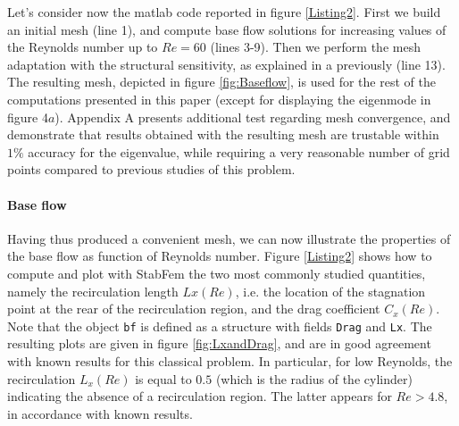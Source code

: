 \documentclass[twocolumn,10pt]{asme2ej}
\begin{document}
Let's consider now the matlab code reported in figure \ref{Listing2}. First we build an initial mesh (line 1), and compute base flow solutions for increasing values of the Reynolds number up to $Re = 60$ (lines 3-9).
Then we perform the mesh adaptation with the structural sensitivity, as explained in a previously (line 13). 
The resulting mesh, depicted in figure \ref{fig:Baseflow}, is used for the rest of the computations presented in this paper (except for displaying the eigenmode in figure 4$a$). 
Appendix A presents additional test regarding mesh convergence, and demonstrate that results obtained with the resulting mesh are trustable within $1\%$ accuracy for the eigenvalue, while requiring a very reasonable number of grid points compared to previous studies of this problem. 










\paragraph{Base flow}

Having thus produced a convenient mesh, we can now illustrate the properties of the base flow as function of Reynolds number. Figure \ref{Listing2} shows how to compute and plot with StabFem the two most commonly studied quantities, namely the recirculation length $Lx(Re)$, i.e. the location of the stagnation point at the rear of the recirculation region, and the drag coefficient $C_x(Re)$.
Note that the object \verb|bf| is defined as a structure with fields \verb|Drag| and \verb|Lx|. 
The resulting plots are given in figure \ref{fig:LxandDrag}, and are in good agreement with known results for this classical problem.
In particular, for low Reynolds, the recirculation $L_x(Re)$ is equal to $0.5$ (which is the radius of the cylinder) indicating the absence of a recirculation region. The latter appears for $Re > 4.8$, in accordance with known results.
\end{document}
